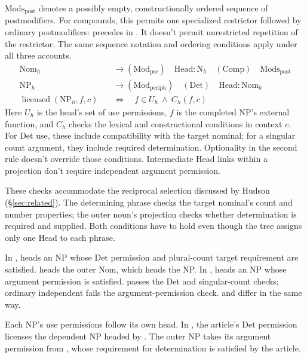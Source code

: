 \documentclass[12pt]{article}
\begin{document}
$\mathrm{Mods}_{\mathrm{post}}$ denotes a possibly empty, constructionally ordered sequence of postmodifiers. For compounds, this permits one specialized restrictor followed by ordinary postmodifiers:  precedes  in . It doesn't permit unrestricted repetition of the restrictor. The same sequence notation and ordering conditions apply under all three accounts.
\[
\begin{aligned}
\mathrm{Nom}_{h} &\to (\mathrm{Mod}_{\mathrm{pre}})\quad \mathrm{Head}:\mathrm{N}_{h}\quad (\mathrm{Comp})\quad \mathrm{Mods}_{\mathrm{post}} \\
\mathrm{NP}_{h} &\to (\mathrm{Mod}_{\mathrm{periph}})\quad (\mathrm{Det})\quad \mathrm{Head}:\mathrm{Nom}_{h} \\
\operatorname{licensed}(\mathrm{NP}_{h},f,c)\quad &\Longleftrightarrow\quad f\in U_h\ \land\ C_h(f,c)
\end{aligned}
\]
Here $U_h$ is the head's set of use permissions, $f$ is the completed NP's external function, and $C_h$ checks the lexical and constructional conditions in context $c$. For Det use, these include compatibility with the target nominal; for a singular count argument, they include required determination. Optionality in the second rule doesn't override those conditions. Intermediate Head links within a projection don't require independent argument permission.

These checks accommodate the reciprocal selection discussed by Hudson (§\ref{sec:related}). The determining phrase checks the target nominal's count and number properties; the outer noun's projection checks whether determination is required and supplied. Both conditions have to hold even though the tree assigns only one Head to each phrase.

In ,  heads an NP whose Det permission and plural-count target requirement are satisfied.  heads the outer Nom, which heads the NP. In ,  heads an NP whose argument permission is satisfied.  passes the Det and singular-count checks; ordinary independent  fails the argument-permission check.  and  differ in the same way.

Each NP's use permissions follow its own head. In , the article's Det permission licenses the dependent NP headed by . The outer NP takes its argument permission from , whose requirement for determination is satisfied by the article.
\end{document}
